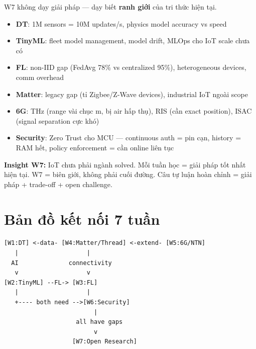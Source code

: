 \documentclass[9pt,a4paper,twocolumn]{article}
\begin{document}
\begin{tcolorbox}[weekbox, title={W7 --- Open Research (Biên giới tri thức)}]

W7 không dạy giải pháp --- dạy biết \textbf{ranh giới} của tri thức hiện tại.

\begin{itemize}
  \item \textbf{DT}: 1M sensors = 10M updates/s, physics model accuracy vs speed
  \item \textbf{TinyML}: fleet model management, model drift, MLOps cho IoT scale chưa có
  \item \textbf{FL}: non-IID gap (FedAvg 78\% vs centralized 95\%), heterogeneous devices, comm overhead
  \item \textbf{Matter}: legacy gap (tỉ Zigbee/Z-Wave devices), industrial IoT ngoài scope
  \item \textbf{6G}: THz (range vài chục m, bị air hấp thụ), RIS (cần exact position), ISAC (signal separation cực khó)
  \item \textbf{Security}: Zero Trust cho MCU --- continuous auth = pin cạn, history = RAM hết, policy enforcement = cần online liên tục
\end{itemize}

\end{tcolorbox}

\begin{tcolorbox}[insightbox]
\scriptsize \textbf{Insight W7:} IoT chưa phải ngành solved. Mỗi tuần học = giải pháp tốt nhất
hiện tại. W7 = biên giới, không phải cuối đường.
Câu tự luận hoàn chỉnh = giải pháp + trade-off + open challenge.
\end{tcolorbox}

\section*{Bản đồ kết nối 7 tuần}

\begin{lstlisting}
[W1:DT] <-data- [W4:Matter/Thread] <-extend- [W5:6G/NTN]
   |                   |
  AI              connectivity
   v                   v
[W2:TinyML] --FL-> [W3:FL]
   |                   |
   +---- both need -->[W6:Security]
                         |
                    all have gaps
                         v
                   [W7:Open Research]
\end{lstlisting}
\end{document}
